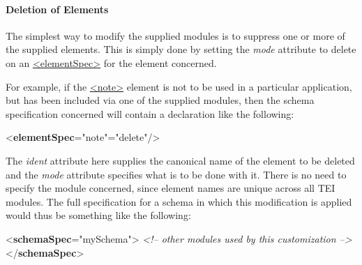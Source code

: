 \paragraph[{Deletion of Elements}]{Deletion of Elements}\label{MDMDSU}\par
The simplest way to modify the supplied modules is to suppress one or more of the supplied elements. This is simply done by setting the {\itshape mode} attribute to delete on an \hyperref[TEI.elementSpec]{<elementSpec>} for the element concerned.\par
For example, if the \hyperref[TEI.note]{<note>} element is not to be used in a particular application, but has been included via one of the supplied modules, then the schema specification concerned will contain a declaration like the following: \par\bgroup{}\exampleFont \begin{shaded}\noindent\mbox{}{<\textbf{elementSpec}\hspace*{1em}{ident}="{note}"\hspace*{1em}{mode}="{delete}"/>}\end{shaded}\egroup\par \noindent  The {\itshape ident} attribute here supplies the canonical name of the element to be deleted and the {\itshape mode} attribute specifies what is to be done with it. There is no need to specify the module concerned, since element names are unique across all TEI modules. The full specification for a schema in which this modification is applied would thus be something like the following: \par\bgroup{}\exampleFont \begin{shaded}\noindent\mbox{}{<\textbf{schemaSpec}\hspace*{1em}{ident}="{mySchema}">}\mbox{}\newline 
{}\mbox{}\newline 
\textit{<!-- other modules used by this customization -->}\mbox{}\newline 
{}\mbox{}\newline 
{</\textbf{schemaSpec}>}\end{shaded}\egroup\par \par
